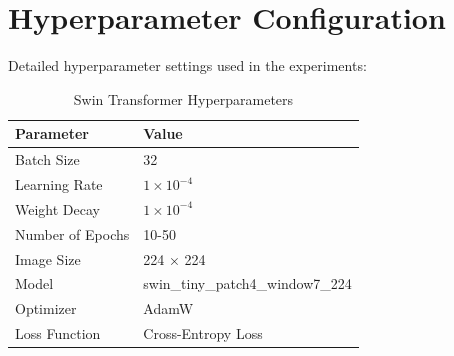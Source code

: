 \documentclass[11pt,a4paper]{report}
\begin{document}
\newpage






















\newpage
\printbibliography[heading=bibintoc, title=References]

\appendix

\chapter{Hyperparameter Configuration}
\label{app:hyperparameters}

Detailed hyperparameter settings used in the experiments:

\begin{table}[H]
\centering
\caption{Swin Transformer Hyperparameters}
\label{tab:hyperparams}
\begin{tabular}{|l|l|}
\hline
\textbf{Parameter} & \textbf{Value} \\
\hline
Batch Size & 32 \\
Learning Rate & $1 \times 10^{-4}$ \\
Weight Decay & $1 \times 10^{-4}$ \\
Number of Epochs & 10-50 \\
Image Size & 224 × 224 \\
Model & swin\_tiny\_patch4\_window7\_224 \\
Optimizer & AdamW \\
Loss Function & Cross-Entropy Loss \\
\hline
\end{tabular}
\end{table}
\end{document}
